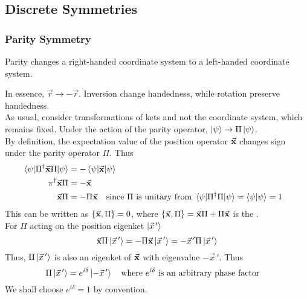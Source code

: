 \documentclass[12pt,a4paper,titlepage]{article}
\newcommand{\ul}[1]{\underline{\smash{#1}}} %
\begin{document}
\subsection{Discrete Symmetries}
\subsubsection{Parity Symmetry}
Parity changes a right-handed coordinate system to a left-handed coordinate system.
\begin{center}
\end{center}
In essence, $\vec{r}\rightarrow-\vec{r}$. Inversion change handedness, while rotation preserve handedness.\\

As usual, consider transformations of kets and not the coordinate system, which remains fixed. Under the action of the parity operator, $\ket{\psi}\rightarrow\Pi\ket{\psi}$.\\

By definition, the expectation value of the position operator $\vec{\vb{x}}$ changes sign under the parity operator $\Pi$. Thus
\begin{equation}
\begin{aligned}
\mel{\psi}{\Pi^{\dagger}\vec{\vb{x}}\Pi}{\psi}&=-\mel{\psi}{\vec{\vb{x}}}{\psi}\\
\pi^{\dagger}\vec{\vb{x}}\Pi&=-\vec{\vb{x}}\\
\vec{\vb{x}}\Pi&=-\Pi\vec{\vb{x}}\qq{since $\Pi$ is unitary from $\mel{\psi}{\Pi^{\dagger}\Pi}{\psi}=\ip{\psi}=1$}
\end{aligned}
\end{equation}
This can be written as $\acomm{\vec{\vb{x}}}{\Pi}=0$, where $\acomm{\vec{\vb{x}}}{\Pi}=\vec{\vb{x}}\Pi+\Pi\vec{\vb{x}}$ is the \ul{anti-commutator}.\\

For $\Pi$ acting on the position eigenket $\ket{\vec{x}\,'}$
\begin{equation}
\vec{\vb{x}}\Pi\ket{\vec{x}\,'}=-\Pi\vec{\vb{x}}\ket{\vec{x}\,'}=-\vec{x}\,'\Pi\ket{\vec{x}\,'}
\end{equation}
Thus, $\Pi\ket{\vec{x}\,'}$ is also an eigenket of $\vec{\vb{x}}$ with eigenvalue $-\vec{x}\,'$. Thus
\begin{equation}
\Pi\ket{\vec{x}\,'}=e^{i\delta}\ket{-\vec{x}\,'}\qq{where $e^{i\delta}$ is an arbitrary phase factor}
\end{equation}
We shall choose $e^{i\delta}=1$ by convention.\\
\end{document}
